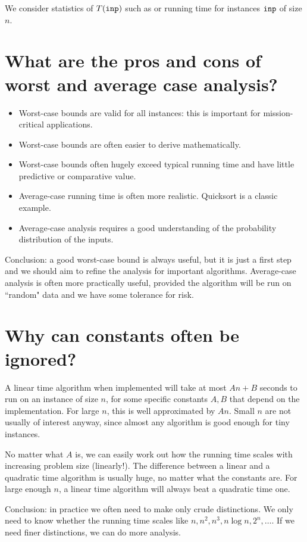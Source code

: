 We consider statistics of $T(\inp)$ such as   or 
 running time for instances $\inp$ of size $n$.


\section{What are the pros and cons of worst and average case analysis?}
\begin{itemize}
\item Worst-case bounds are valid for all instances: 
this is important for mission-critical applications.
\item Worst-case bounds are often easier to derive mathematically.
\item Worst-case bounds often hugely exceed typical running time and 
have little predictive or comparative value. 
\item Average-case running time is often more realistic. Quicksort is a classic 
example.
\item Average-case analysis requires a good understanding of the probability 
distribution of the inputs.
\end{itemize}
Conclusion: a good worst-case bound is always useful, but it is
just a first step and we should aim to refine the analysis for important 
algorithms. Average-case analysis is often more practically useful, provided the
 algorithm will be run on ``random" data and we have some tolerance for risk.

\section{Why can constants often be ignored?}

A linear time algorithm when implemented will take at most $A
n + B$ seconds to run on an instance of size $n$, for some
specific constants $A, B$ that depend on the implementation. For large $n$, this is well approximated by $A n$. 
Small $n$ are not usually of interest anyway, since almost any algorithm is good
 enough for tiny instances. 
 
No matter what $A$ is, we can easily work out how the running time
scales with increasing problem size (linearly!). The difference between a linear and a quadratic time algorithm is
usually huge, no matter what the constants are. For large enough $n$, a
linear time algorithm will always beat a quadratic time one. 

Conclusion: in practice we often need to make only crude
distinctions. We only need to know whether the running time scales like 
$n, n^2, n^3, n \log n, 2^n, \dots$. If we need finer distinctions, we 
can do more analysis.



